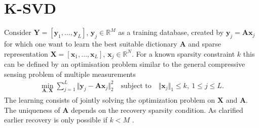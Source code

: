\section{K-SVD}\label{sec:dictionarylearning}
Consider $\mathbf{Y} = \left[ \mathbf{y}_1, \dots, \mathbf{y}_L \right]$, $\mathbf{y}_j \in \mathbb{R}^M$ as a training database, created by $\mathbf{y}_j = \mathbf{A}\mathbf{x}_j$ for which one want to learn the best suitable dictionary $\mathbf{A}$ and sparse representation $\mathbf{X} = \left[ \mathbf{x}_1, \dots, \mathbf{x}_L  \right]$, $\mathbf{x}_j \in \mathbb{R}^N$. For a known sparsity constraint $k$ this can be defined by an optimisation problem similar to the general compressive sensing problem of multiple measurements \cite{Elad_book}
\begin{align}\label{eq:SVD1}
\min_{\mathbf{A,X}} \sum_{j=1}^{L} \Vert \mathbf{y}_j - \mathbf{Ax}_j \Vert_2^2 \quad \text{subject to} \quad \Vert \textbf{x}_j \Vert_1 \leq k, \ 1 \leq j \leq L.
\end{align}  
The learning consists of jointly solving the optimization problem on $\mathbf{X}$ and $\mathbf{A}$. The uniqueness of $\mathbf{A}$ depends on the recovery sparsity condition. As clarified earlier recovery is only possible if $k < M$ \cite{phd2015}. 


